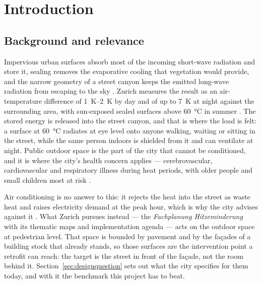 \section{Introduction}

\subsection{Background and relevance}

Impervious urban surfaces absorb most of the incoming short-wave radiation and
store it, sealing removes the evaporative cooling that vegetation would
provide, and the narrow geometry of a street canyon keeps the emitted long-wave
radiation from escaping to the sky \parencite{oke1982}. Zurich measures the
result as an air-temperature difference of \qtyrange{1}{2}{\kelvin} by day and
of up to \qty{7}{\kelvin} at night against the surrounding area, with
sun-exposed sealed surfaces above \qty{60}{\celsius} in summer
\parencite{stadtzuerich_merkblatt}. The stored energy is released into the
street canyon, and that is where the load is felt: a surface at
\qty{60}{\celsius} radiates at eye level onto anyone walking, waiting or
sitting in the street, while the same person indoors is shielded from it and
can ventilate at night. Public outdoor space is the part of the city that
cannot be conditioned, and it is where the city's health concern applies ---
cerebrovascular, cardiovascular and respiratory illness during heat periods,
with older people and small children most at risk
\parencite{stadtzuerich_merkblatt}.

Air conditioning is no answer to this: it rejects the heat into the street as
waste heat and raises electricity demand at the peak hour, which is why the
city advises against it \parencite[132--133]{stadtzuerich2020}. What Zurich
pursues instead --- the \emph{Fachplanung Hitzeminderung} with its thematic
maps and implementation agenda
\parencite{stadtzuerich2020,stadtzuerich_teilplaene,stadtzuerich_agenda} ---
acts on the outdoor space at pedestrian level. That space is bounded by
pavement and by the façades of a building stock that already stands, so those
surfaces are the intervention point a retrofit can reach: the target is the
street in front of the façade, not the room behind it.
Section~\ref{sec:designquestion} sets out what the city specifies for them today,
and with it the benchmark this project has to beat.

